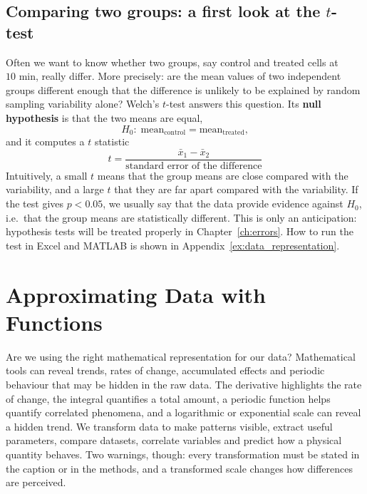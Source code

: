 \documentclass[letterpaper,11pt,leqno]{book}
\begin{document}
\subsection{Comparing two groups: a first look at the \texorpdfstring{$t$}{t}-test}
\label{sec:welch_anticipation}

Often we want to know whether two groups, say control and treated cells at $10\text{ min}$, really differ. More precisely: are the mean values of two independent groups different enough that the difference is unlikely to be explained by random sampling variability alone? Welch's $t$-test answers this question. Its \textbf{null hypothesis} is that the two means are equal,
\begin{equation}
H_0: \; \text{mean}_{\text{control}} = \text{mean}_{\text{treated}},
\label{eq:null_hypothesis}
\end{equation}
and it computes a $t$ statistic
\begin{equation}
\boxed{t = \frac{\bar{x}_1 - \bar{x}_2}{\text{standard error of the difference}}}
\label{eq:t_statistic_general}
\end{equation}
Intuitively, a small $t$ means that the group means are close compared with the variability, and a large $t$ that they are far apart compared with the variability. If the test gives $p < 0.05$, we usually say that the data provide evidence against $H_0$, i.e.\ that the group means are statistically different. This is only an anticipation: hypothesis tests will be treated properly in Chapter~\ref{ch:errors}. How to run the test in Excel and MATLAB is shown in Appendix~\ref{ex:data_representation}.

\section{Approximating Data with Functions}
\label{sec:why_approximate}

Are we using the right mathematical representation for our data? Mathematical tools can reveal trends, rates of change, accumulated effects and periodic behaviour that may be hidden in the raw data. The derivative highlights the rate of change, the integral quantifies a total amount, a periodic function helps quantify correlated phenomena, and a logarithmic or exponential scale can reveal a hidden trend. We transform data to make patterns visible, extract useful parameters, compare datasets, correlate variables and predict how a physical quantity behaves. Two warnings, though: every transformation must be stated in the caption or in the methods, and a transformed scale changes how differences are perceived.
\end{document}
